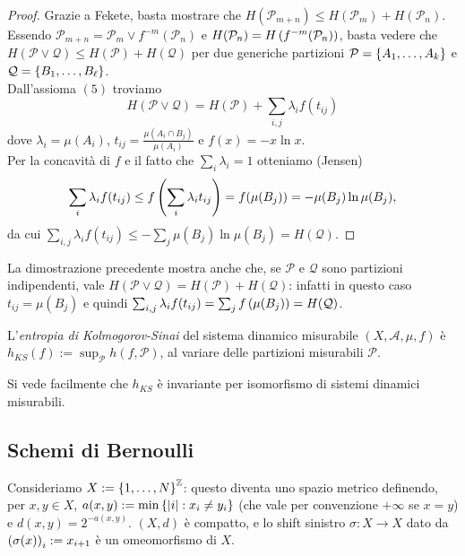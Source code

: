 \begin{proof}Grazie a Fekete, basta mostrare che $H(\mathcal{P}_{m+n})\le H(\mathcal{P}_m)+H(\mathcal{P}_n)$.
Essendo $\mathcal{P}_{m+n}=\mathcal{P}_m\vee f^{-m}(\mathcal{P}_n)$ e $H(\mathcal{P}_n)=H\left(f^{-m}(\mathcal{P}_n)\right)$,
basta vedere che $H(\mathcal{P}\vee\mathcal{Q})\le H(\mathcal{P})+H(\mathcal{Q})$ per due generiche
partizioni $\mathcal{P}=\left\{A_1,\dots,A_k\right\}$ e $\mathcal{Q}=\left\{B_1,\dots,B_\ell\right\}$. \\
Dall'assioma $(5)$ troviamo
\[ H(\mathcal{P}\vee\mathcal{Q})=H(\mathcal{P})+\sum_{i,j}\lambda_i f(t_{ij}) \]
dove $\lambda_i=\mu(A_i)$, $t_{ij}=\frac{\mu(A_i\cap B_j)}{\mu(A_i)}$ e $f(x)=-x\ln x$. \\
Per la concavità di $f$ e il fatto che $\sum_i\lambda_i=1$ otteniamo (Jensen)
\[ \sum_i \lambda_i f(t_{ij})\le f\left(\sum_i\lambda_i t_{ij}\right)=f(\mu(B_j))=-\mu(B_j)\ln\mu(B_j), \]
da cui $\sum_{i,j}\lambda_i f(t_{ij})\le -\sum_j \mu(B_j)\ln\mu(B_j)=H(\mathcal{Q})$.
\end{proof}

\begin{oss}La dimostrazione precedente mostra anche che, se $\mathcal{P}$ e $\mathcal{Q}$ sono partizioni indipendenti,
vale $H(\mathcal{P}\vee\mathcal{Q})=H(\mathcal{P})+H(\mathcal{Q})$: infatti in questo caso $t_{ij}=\mu(B_j)$
e quindi $\sum_{i,j}\lambda_i f(t_{ij})=\sum_j f\left(\mu(B_j)\right)=H(\mathcal{Q})$.
\end{oss}

\begin{defi}L'\emph{entropia di Kolmogorov-Sinai} del sistema dinamico misurabile $(X,\mathcal{A},\mu,f)$ è
$h_{KS}(f):=\sup_{\mathcal{P}}h(f,\mathcal{P})$, al variare delle partizioni misurabili $\mathcal{P}$.
\end{defi}

\begin{oss}Si vede facilmente che $h_{KS}$ è invariante per isomorfismo di sistemi dinamici misurabili.
\end{oss}

\subsection{Schemi di Bernoulli}


Consideriamo $X:=\left\{1,\dots,N\right\}^{\mathbb{Z}}$: questo diventa uno spazio metrico definendo, per $x,y\in X$, $a(x,y):=\min\left\{\left|i\right|:x_i\neq y_i\right\}$ 
(che vale per convenzione $+\infty$ se $x=y$) e $d(x,y)=2^{-a(x,y)}$. $(X,d)$ è compatto, e lo shift sinistro $\sigma:X\to X$ dato da $\left(\sigma(x)\right)_i:=x_{i+1}$ 
è un omeomorfismo di $X$.


